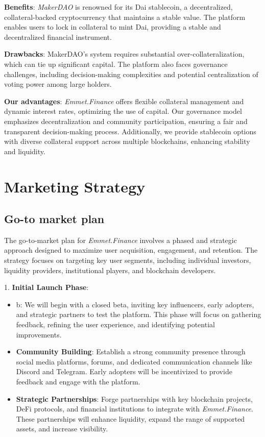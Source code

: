 \documentclass[12pt, a4paper]{article}
\begin{document}
\textbf{Benefits}: \textit{MakerDAO} is renowned for its Dai stablecoin, a decentralized, collateral-backed cryptocurrency that maintains a stable value. The platform enables users to lock in collateral to mint Dai, providing a stable and decentralized financial instrument.

\textbf{Drawbacks}: MakerDAO's system requires substantial over-collateralization, which can tie up significant capital. The platform also faces governance challenges, including decision-making complexities and potential centralization of voting power among large holders.

\textbf{Our advantages}: \textit{Emmet.Finance} offers flexible collateral management and dynamic interest rates, optimizing the use of capital. Our governance model emphasizes decentralization and community participation, ensuring a fair and transparent decision-making process. Additionally, we provide stablecoin options with diverse collateral support across multiple blockchains, enhancing stability and liquidity.

\section{Marketing Strategy}

\subsection{Go-to market plan}

The go-to-market plan for \textit{Emmet.Finance} involves a phased and strategic approach designed to maximize user acquisition, engagement, and retention. The strategy focuses on targeting key user segments, including individual investors, liquidity providers, institutional players, and blockchain developers.

1. \textbf{Initial Launch Phase}:
   \begin{itemize}
       \item b: We will begin with a closed beta, inviting key influencers, early adopters, and strategic partners to test the platform. This phase will focus on gathering feedback, refining the user experience, and identifying potential improvements.
       \item \textbf{Community Building}: Establish a strong community presence through social media platforms, forums, and dedicated communication channels like Discord and Telegram. Early adopters will be incentivized to provide feedback and engage with the platform.
       \item \textbf{Strategic Partnerships}: Forge partnerships with key blockchain projects, DeFi protocols, and financial institutions to integrate with \textit{Emmet.Finance}. These partnerships will enhance liquidity, expand the range of supported assets, and increase visibility.
   \end{itemize}
\end{document}
